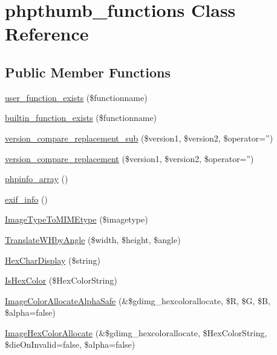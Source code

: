 \hypertarget{classphpthumb__functions}{\section{phpthumb\-\_\-functions \-Class \-Reference}
\label{classphpthumb__functions}
}
\subsection*{\-Public \-Member \-Functions}
\begin{DoxyCompactItemize}
\item 
\hyperlink{classphpthumb__functions_ac2890f15a3ea4a6ea63adca8f7f489a8}{user\-\_\-function\-\_\-exists} (\$functionname)
\item 
\hyperlink{classphpthumb__functions_af8479c23712b7ac1502d1d7fc76b7670}{builtin\-\_\-function\-\_\-exists} (\$functionname)
\item 
\hyperlink{classphpthumb__functions_a66d2b067747c447ecd3d48dd6830ea78}{version\-\_\-compare\-\_\-replacement\-\_\-sub} (\$version1, \$version2, \$operator='')
\item 
\hyperlink{classphpthumb__functions_af53f41b3482e6bed2082daa0ebfd96c0}{version\-\_\-compare\-\_\-replacement} (\$version1, \$version2, \$operator='')
\item 
\hyperlink{classphpthumb__functions_a999167c99797fa10b27c9f9d8d4d6814}{phpinfo\-\_\-array} ()
\item 
\hyperlink{classphpthumb__functions_a6b7e8055a24dbfa6519a817282f5fedb}{exif\-\_\-info} ()
\item 
\hyperlink{classphpthumb__functions_af58958c94226ace6fd0facaf44a3cd6d}{\-Image\-Type\-To\-M\-I\-M\-Etype} (\$imagetype)
\item 
\hyperlink{classphpthumb__functions_a9fdbba8c153ac6c99299545f0109dd70}{\-Translate\-W\-Hby\-Angle} (\$width, \$height, \$angle)
\item 
\hyperlink{classphpthumb__functions_a990a73d0fe31b520e04251295aeded25}{\-Hex\-Char\-Display} (\$string)
\item 
\hyperlink{classphpthumb__functions_aa88047663adfed917d5fb0bece3913b8}{\-Is\-Hex\-Color} (\$\-Hex\-Color\-String)
\item 
\hyperlink{classphpthumb__functions_ab43fe1af0d0c46288c2ffcf3905a7b42}{\-Image\-Color\-Allocate\-Alpha\-Safe} (\&\$gdimg\-\_\-hexcolorallocate, \$\-R, \$\-G, \$\-B, \$alpha=false)
\item 
\hyperlink{classphpthumb__functions_a9a63d0b70df4136de64ab0cd351e7ff3}{\-Image\-Hex\-Color\-Allocate} (\&\$gdimg\-\_\-hexcolorallocate, \$\-Hex\-Color\-String, \$die\-On\-Invalid=false, \$alpha=false)

\end{DoxyCompactItemize}
